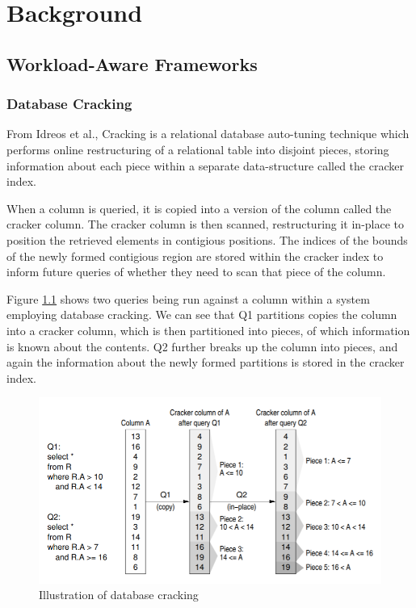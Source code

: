 \chapter{Background}

\label{ch:background}

\section{Workload-Aware Frameworks}

\subsection{Database Cracking}

From Idreos et al., Cracking is a relational database auto-tuning technique which performs online
restructuring of a relational table into disjoint pieces, storing information about each piece within
a separate data-structure called the cracker index.

When a column is queried, it is copied into a version of the column called the cracker column. The
cracker column is then scanned, restructuring it in-place to position the retrieved elements in
contigious positions. The indices of the bounds of the newly formed contigious region are stored
within the cracker index to inform future queries of whether they need to scan that piece of the
column.

Figure \ref{fig:cracking_img} shows two queries being run against a column within a system employing
database cracking. We can see that Q1 partitions copies the column into a cracker column, which is
then partitioned into pieces, of which information is known about the contents. Q2 further breaks
up the column into pieces, and again the information about the newly formed partitions is stored
in the cracker index.

\begin{figure}[h]
  \includegraphics[width=\textwidth]{cracking_img}
  \caption{Illustration of database cracking}
  \label{fig:cracking_img}
\end{figure}

